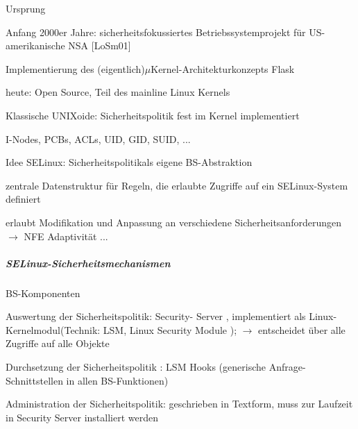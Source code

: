 \documentclass[a4paper]{article}
\begin{document}
\begin{multicols}{3}
    \begin{itemize*}
        \item
        Ursprung
        \begin{itemize*}
            \item Anfang 2000er Jahre: sicherheitsfokussiertes Betriebssystemprojekt für US-amerikanische NSA [LoSm01]
            \item Implementierung des (eigentlich)$\mu$Kernel-Architekturkonzepts Flask
            \item heute: Open Source, Teil des mainline Linux Kernels
        \end{itemize*}
        \item
        Klassische UNIXoide: Sicherheitspolitik fest im Kernel implementiert
        \begin{itemize*}
            \item I-Nodes, PCBs, ACLs, UID, GID, SUID, ...
        \end{itemize*}
        \item
        Idee SELinux: Sicherheitspolitikals eigene BS-Abstraktion
        \begin{itemize*}
            \item zentrale Datenstruktur für Regeln, die erlaubte Zugriffe auf ein SELinux-System definiert
            \item erlaubt Modifikation und Anpassung an verschiedene Sicherheitsanforderungen $\rightarrow$ NFE Adaptivität ...
        \end{itemize*}
    \end{itemize*}


    \subparagraph{SELinux-Sicherheitsmechanismen}

    BS-Komponenten

    \begin{itemize*}
        \item
        Auswertung der Sicherheitspolitik: Security- Server , implementiert
        als Linux-Kernelmodul(Technik: LSM, Linux Security Module );
        $\rightarrow$ entscheidet über alle Zugriffe auf alle
        Objekte
        \item
        Durchsetzung der Sicherheitspolitik : LSM Hooks (generische
        Anfrage-Schnittstellen in allen BS-Funktionen)
        \item
        Administration der Sicherheitspolitik: geschrieben in Textform, muss
        zur Laufzeit in Security Server installiert werden
    \end{itemize*}


\end{multicols}
\end{document}
